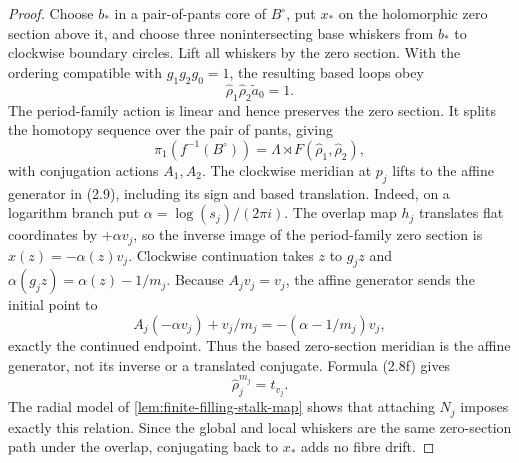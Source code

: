 \begin{proof}
Choose \(b_*\) in a pair-of-pants core of \(B^\circ\), put \(x_*\) on the
holomorphic zero section above it, and choose three nonintersecting base
whiskers from \(b_*\) to clockwise boundary circles.  Lift all whiskers by
the zero section.  With the ordering compatible with \(g_1g_2g_0=1\), the
resulting based loops obey
\[
 \widehat\rho_1\widehat\rho_2\widetilde a_0=1.
\tag{5.23a}
\]
The period-family action is linear and hence preserves the zero section.
It splits the homotopy sequence over the pair of pants, giving
\[
 \pi_1(f^{-1}(B^\circ))=
 \Lambda\rtimes F(\widehat\rho_1,\widehat\rho_2),
\]
with conjugation actions \(A_1,A_2\).  The clockwise meridian at \(p_j\)
lifts to the affine generator in (2.9), including its sign and based
translation.  Indeed, on a logarithm branch put
\(\alpha=\log(s_j)/(2\pi i)\).  The overlap map \(h_j\) translates flat
coordinates by \(+\alpha v_j\), so the inverse image of the period-family
zero section is \(x(z)=-\alpha(z)v_j\).  Clockwise continuation takes
\(z\) to \(g_jz\) and
\(\alpha(g_jz)=\alpha(z)-1/m_j\).  Because \(A_jv_j=v_j\), the affine
generator sends the initial point to
\[
 A_j(-\alpha v_j)+v_j/m_j
   =-(\alpha-1/m_j)v_j,
\]
exactly the continued endpoint.  Thus the based zero-section meridian is
the affine generator, not its inverse or a translated conjugate.  Formula
(2.8f) gives
\[
 \widehat\rho_j^{m_j}=t_{v_j}.
\tag{5.23b}
\]
The radial model of \cref{lem:finite-filling-stalk-map} shows that attaching
\(N_j\) imposes exactly this relation.  Since the global and local whiskers
are the same zero-section path under the overlap, conjugating back to
\(x_*\) adds no fibre drift.


\end{proof}

